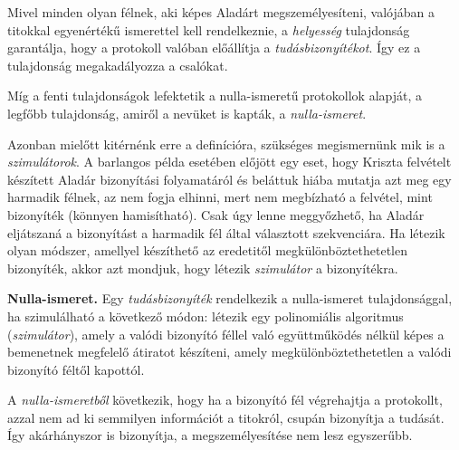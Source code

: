 Mivel minden olyan félnek, aki képes Aladárt megszemélyesíteni, valójában a titokkal egyenértékű ismerettel kell rendelkeznie, a \textit{helyesség} tulajdonság garantálja, hogy a protokoll valóban előállítja a \textit{tudásbizonyítékot}. Így ez a tulajdonság megakadályozza a csalókat.

Míg a fenti tulajdonságok lefektetik a nulla-ismeretű protokollok alapját, a legfőbb tulajdonság, amiről a nevüket is kapták, a \textit{nulla-ismeret}.

Azonban mielőtt kitérnénk erre a definícióra, szükséges megismernünk mik is a \textit{szimulátorok}. A barlangos példa esetében előjött egy eset, hogy Kriszta felvételt készített Aladár bizonyítási folyamatáról és beláttuk hiába mutatja azt meg egy harmadik félnek, az nem fogja elhinni, mert nem megbízható a felvétel, mint bizonyíték (könnyen hamisítható). Csak úgy lenne meggyőzhető, ha Aladár eljátszaná a bizonyítást a harmadik fél által választott szekvenciára. Ha létezik olyan módszer, amellyel készíthető az eredetitől megkülönböztethetetlen bizonyíték, akkor azt mondjuk, hogy létezik \textit{szimulátor} a bizonyítékra.

\begin{definition}
    \textbf{Nulla-ismeret.} Egy \textit{tudásbizonyíték} rendelkezik a nulla-ismeret tulajdonsággal, ha szimulálható a következő módon: létezik egy polinomiális algoritmus (\textit{szimulátor}), amely a valódi bizonyító féllel való együttműködés nélkül képes a bemenetnek megfelelő átiratot készíteni, amely megkülönböztethetetlen a valódi bizonyító féltől kapottól.
\end{definition}

A \textit{nulla-ismeretből} következik, hogy ha a bizonyító fél végrehajtja a protokollt, azzal nem ad ki semmilyen információt a titokról, csupán bizonyítja a tudását. Így akárhányszor is bizonyítja, a megszemélyesítése nem lesz egyszerűbb.